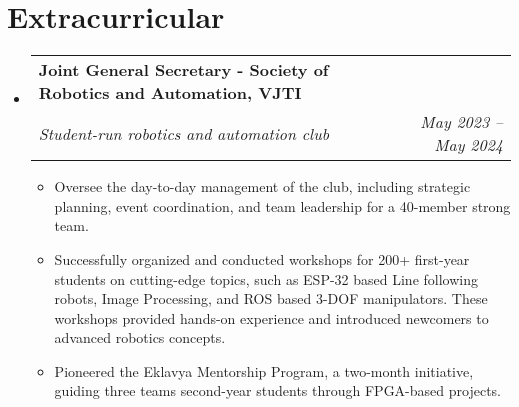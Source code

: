 \documentclass[letterpaper,11pt]{article}
\makeatletter
\newcommand{\resumeItem}[1]{
  \item\small{
    {#1 \vspace{-2pt}}
  }
}
\newcommand{\resumeSubheading}[4]{
  \vspace{-2pt}\item
    \begin{tabular*}{1.0\textwidth}[t]{l@{\extracolsep{\fill}}r}
      \textbf{#1} & \textbf{\small #2} \\
      \textit{\small#3} & \textit{\small #4} \\
    \end{tabular*}\vspace{-7pt}
}
\newcommand{\resumeSubHeadingListStart}{\begin{itemize}[leftmargin=0.0in, label={}]}
\newcommand{\resumeSubHeadingListEnd}{\end{itemize}}
\newcommand{\resumeItemListStart}{\begin{itemize}}
\newcommand{\resumeItemListEnd}{\end{itemize}\vspace{-5pt}}
\makeatother
\begin{document}
\section{Extracurricular}
  \resumeSubHeadingListStart
      \resumeSubheading
      {Joint General Secretary - Society of Robotics and Automation, VJTI}{}{Student-run robotics and automation club \href{https://sravjti.in}{\faExternalLink}}{May 2023 -- May 2024}
      \resumeItemListStart
          \resumeItem{Oversee the day-to-day management of the club, including strategic planning, event coordination, and team leadership for a 40-member strong team.}
          \resumeItem{Successfully organized and conducted workshops for 200+ first-year students on cutting-edge topics, such as ESP-32 based Line following robots, Image Processing, and ROS based 3-DOF manipulators. These workshops provided hands-on experience and introduced newcomers to advanced robotics concepts.}
          \resumeItem{Pioneered the Eklavya Mentorship Program, a two-month initiative, guiding three teams second-year students through FPGA-based projects.}
      \resumeItemListEnd
  \resumeSubHeadingListEnd
\end{document}
